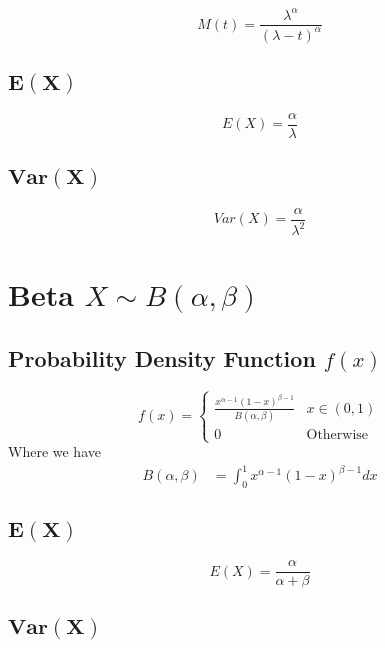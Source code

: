 \documentclass[12pt]{article}
\begin{document}
\begin{equation*}
    M(t)=\frac{\lambda^{\alpha}}{(\lambda -t)^{\alpha}}
\end{equation*}

\subsection{$\bm{E(X)}$}

\begin{equation*}
  E(X) = \frac{\alpha}{\lambda}
\end{equation*}

\subsection{$\bm{Var(X)}$}

\begin{equation*}
  Var(X)= \frac{\alpha}{\lambda^{2}}
\end{equation*}
\newpage
\section{Beta $X \sim B(\alpha,\beta)$}
\subsection{Probability Density Function $f(x)$}

\begin{equation*}
  f(x) =
  \begin{cases}
     \frac{x^{\alpha -1} (1-x)^{\beta -1}}{B(\alpha,\beta)} & x \in (0,1) \\
     0 & \text{Otherwise}
  \end{cases}
\end{equation*}
Where we have
\begin{align*}
  B(\alpha,\beta) &= \int_{0}^{1}x^{\alpha -1}(1-x)^{\beta -1} dx
\end{align*}

\subsection{$\bm{E(X)}$}

\begin{equation*}
  E(X) = \frac{\alpha}{\alpha + \beta}
\end{equation*}

\subsection{$\bm{Var(X)}$}
\end{document}
